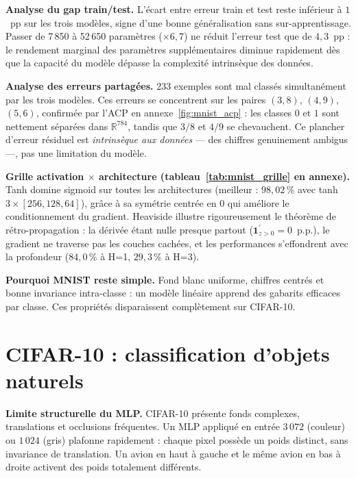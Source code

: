 \documentclass[10pt, a4paper]{article}
\begin{document}
\textbf{Analyse du gap train/test.}
L'écart entre erreur train et test reste inférieur à $1$~pp sur les trois modèles,
signe d'une bonne généralisation sans sur-apprentissage.
Passer de 7\,850 à 52\,650 paramètres ($\times 6{,}7$) ne réduit l'erreur test que de
$4{,}3$~pp : le rendement marginal des paramètres supplémentaires diminue rapidement
dès que la capacité du modèle dépasse la complexité intrinsèque des données.

\textbf{Analyse des erreurs partagées.}
233 exemples sont mal classés simultanément par les trois modèles.
Ces erreurs se concentrent sur les paires $(3,8)$, $(4,9)$, $(5,6)$, confirmée par l'ACP
en annexe~\ref{fig:mnist_acp} : les classes $0$ et $1$ sont nettement séparées dans
$\mathbb{R}^{784}$, tandis que $3/8$ et $4/9$ se chevauchent.
Ce plancher d'erreur résiduel est \emph{intrinsèque aux données} — des chiffres
genuinement ambigus —, pas une limitation du modèle.

\textbf{Grille activation $\times$ architecture (tableau~\ref{tab:mnist_grille}
en annexe).}
Tanh domine sigmoid sur toutes les architectures (meilleur : $98{,}02\,\%$ avec tanh
$3{\times}[256,128,64]$), grâce à sa symétrie centrée en $0$ qui améliore le
conditionnement du gradient.
Heaviside illustre rigoureusement le théorème de rétro-propagation : la dérivée étant
nulle presque partout ($\mathbf{1}_{z>0}^{\prime}=0$~p.p.), le gradient ne traverse pas
les couches cachées, et les performances s'effondrent avec la profondeur
($84{,}0\,\%$ à H=1, $29{,}3\,\%$ à H=3).

\textbf{Pourquoi MNIST reste simple.}
Fond blanc uniforme, chiffres centrés et bonne invariance intra-classe : un modèle
linéaire apprend des gabarits efficaces par classe. Ces propriétés disparaissent
complètement sur CIFAR-10.

\section{CIFAR-10 : classification d'objets naturels}

\textbf{Limite structurelle du MLP.}
CIFAR-10 présente fonds complexes, translations et occlusions fréquentes.
Un MLP appliqué en entrée $3\,072$ (couleur) ou $1\,024$ (gris) plafonne rapidement :
chaque pixel possède un poids distinct, sans invariance de translation.
Un avion en haut à gauche et le même avion en bas à droite activent des poids
totalement différents.
\end{document}
